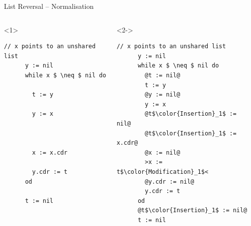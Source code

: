 \documentclass[xcolor={usenames,dvipsnames}]{beamer}
\begin{document}
\begin{frame}[fragile]{List Reversal -- Normalisation}
  \begin{columns}[T]
	  \begin{onlyenv}
	  \begin{lstlisting}[mathescape=true]
	  // x points to an unshared list
	  y := nil
	  while x $ \neq $ nil do

	    t := y

	    y := x



	    x := x.cdr

	    y.cdr := t
	  od

	  t := nil
	  \end{lstlisting}
	  \end{onlyenv}
	  \begin{onlyenv}<2->
	  \begin{lstlisting}[mathescape=true]
	  // x points to an unshared list
	  y := nil
	  while x $ \neq $ nil do
	    @t := nil@
	    t := y
	    @y := nil@
	    y := x
	    @t$\color{Insertion}_1$ := nil@
	    @t$\color{Insertion}_1$ := x.cdr@
	    @x := nil@
	    >x := t$\color{Modification}_1$<
	    @y.cdr := nil@
	    y.cdr := t
	  od
	  @t$\color{Insertion}_1$ := nil@
	  t := nil
	  \end{lstlisting}
        \end{onlyenv}
        \pause\pause
\end{columns}
\end{frame}
\end{document}
